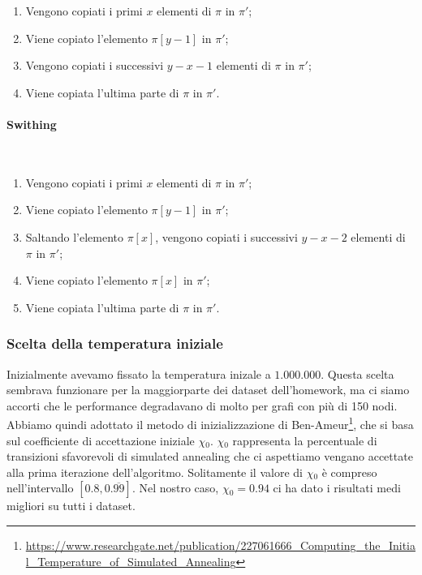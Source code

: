 \begin{enumerate}
    \item Vengono copiati i primi $x$ elementi di $\pi$ in $\pi'$;
    \item Viene copiato l'elemento $\pi[y-1]$ in $\pi'$;
    \item Vengono copiati i successivi $y - x - 1$ elementi di $\pi$ in $\pi'$;
    \item Viene copiata l'ultima parte di $\pi$ in $\pi'$.
\end{enumerate}

\paragraph{Swithing}\mbox{}\\

\begin{enumerate}
    \item Vengono copiati i primi $x$ elementi di $\pi$ in $\pi'$;
    \item Viene copiato l'elemento $\pi[y-1]$ in $\pi'$;
    \item Saltando l'elemento $\pi[x]$, vengono copiati i successivi $y - x - 2$ elementi di $\pi$ in $\pi'$;
    \item Viene copiato l'elemento $\pi[x]$ in $\pi'$;
    \item Viene copiata l'ultima parte di $\pi$ in $\pi'$.
\end{enumerate}

\subsubsection{Scelta della temperatura iniziale}

Inizialmente avevamo fissato la temperatura inizale a $1.000.000$. Questa scelta sembrava funzionare per la maggiorparte dei dataset dell'homework, ma ci siamo accorti che le performance degradavano di molto per grafi con più di 150 nodi. \\

\noindent Abbiamo quindi adottato il metodo di inizializzazione di Ben-Ameur\footnote{\url{https://www.researchgate.net/publication/227061666_Computing_the_Initial_Temperature_of_Simulated_Annealing}}, che si basa sul coefficiente di accettazione iniziale $\chi{}_0$. $\chi{}_0$ rappresenta la percentuale di transizioni sfavorevoli di simulated annealing che ci aspettiamo vengano accettate alla prima iterazione dell'algoritmo. Solitamente il valore di $\chi{}_0$ è compreso nell'intervallo $[0.8, 0.\overline{99}]$. Nel nostro caso, $\chi{}_0 = 0.94$ ci ha dato i risultati medi migliori su tutti i dataset. \\

